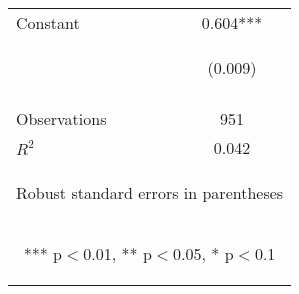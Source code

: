 \begin{center}
\begin{tabular}{lc}
Constant & 0.604*** \\
 & \begin{footnotesize}(0.009)\end{footnotesize} \\
\vspace{4pt} & \begin{footnotesize}\end{footnotesize} \\
Observations & 951 \\
 $R^2$ & 0.042 \\ \hline
\multicolumn{2}{c}{\begin{footnotesize} Robust standard errors in parentheses\end{footnotesize}} \\
\multicolumn{2}{c}{\begin{footnotesize} *** p$<$0.01, ** p$<$0.05, * p$<$0.1\end{footnotesize}} \\
\end{tabular}
\end{center}
